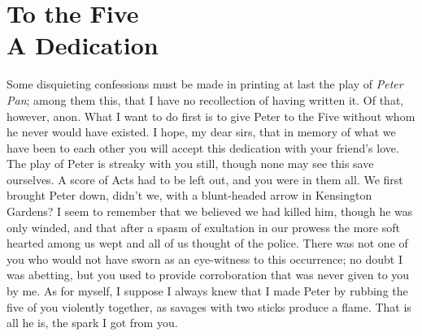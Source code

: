 
\section[To the Five: A Dedication]{To the Five\\A Dedication}

Some disquieting confessions must be made in printing at last the play of \emph{Peter Pan};
among them this, that I have no recollection of having written it.
Of that, however, anon.
What I want to do first is to give Peter to the Five without whom he never would have existed.
I hope, my dear sirs,
that in memory of what we have been to each other
you will accept this dedication with your friend’s love.
The play of Peter is streaky with you still,
though none may see this save ourselves.
A score of Acts had to be left out, and you were in them all.
We first brought Peter down, didn’t we, with a blunt-headed arrow in Kensington Gardens?
I seem to remember that we believed we had killed him,
though he was only winded,
and that after a spasm of exultation in our prowess
the more soft hearted among us wept and all of us thought of the police.
There was not one of you who would not have sworn as an eye-witness to this occurrence;
no doubt I was abetting,
but you used to provide corroboration that was never given to you by me.
As for myself,
I suppose I always knew that I made Peter by rubbing the five of you violently together,
as savages with two sticks produce a flame.
That is all he is, the spark I got from you.

